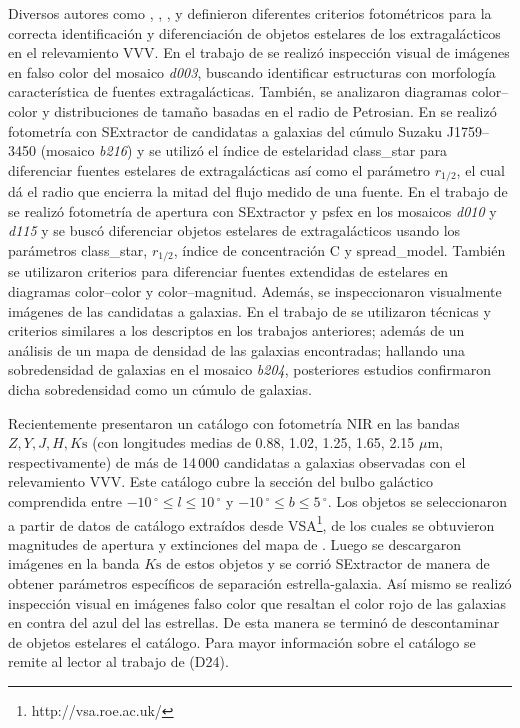 \documentclass[baaa]{baaa}
\begin{document}
Diversos autores como \cite{amores2012}, \cite{coldwell2014}, \cite{baravalle2018}, \cite{galdeano2021} y \cite{Duplancic2024} definieron diferentes criterios fotométricos para la correcta identificación y diferenciación de objetos estelares de los extragalácticos en el relevamiento VVV. En el trabajo de \cite{amores2012} se realizó inspección visual de imágenes en falso color del mosaico \textit{d003}, buscando identificar estructuras con morfología característica de fuentes extragalácticas. También, se analizaron diagramas color--color y distribuciones de tamaño basadas en el radio de Petrosian. En \cite{coldwell2014} se realizó fotometría con {\sc SExtractor} \citep{bertin} de candidatas a galaxias del cúmulo Suzaku J1759--3450 (mosaico \textit{b216}) y se utilizó el índice de estelaridad {\rm class\_star} para diferenciar fuentes estelares de extragalácticas así como el parámetro $r_{1/2}$, el cual dá el radio que encierra la mitad del flujo medido de una fuente. En el trabajo de \cite{baravalle2018} se realizó fotometría de apertura con {\sc SExtractor} y {\sc psfex} \citep{bertin2011} en los mosaicos \textit{d010} y \textit{d115} y se buscó diferenciar objetos estelares de extragalácticos usando los parámetros {\rm class\_star}, $r_{1/2}$, índice de concentración C y {\rm spread\_model}. También se utilizaron criterios para diferenciar fuentes extendidas de estelares en diagramas color--color y color--magnitud. Además, se inspeccionaron visualmente imágenes de las candidatas a galaxias. En el trabajo de \cite{galdeano2021} se utilizaron técnicas y criterios similares a los descriptos en los trabajos anteriores; además de un análisis de un mapa de densidad de las galaxias encontradas; hallando una sobredensidad de galaxias en el mosaico \textit{b204}, posteriores estudios \citep{galdeano2022} confirmaron dicha sobredensidad como un cúmulo de galaxias.

Recientemente \cite{Duplancic2024} presentaron un catálogo con  fotometría NIR en las bandas $Z, Y, J, H, K\mathrm{s}$ (con longitudes medias de 0.88, 1.02, 1.25, 1.65, 2.15 $\mu \mathrm{m}$, respectivamente) de más de 14\,000 candidatas a galaxias observadas con el relevamiento VVV. Este catálogo cubre la sección del bulbo galáctico comprendida entre $-10\,^\circ \leq l \leq 10\,^\circ$ y $-10\,^\circ\leq b \leq 5\,^\circ$.  Los objetos se seleccionaron a partir de datos de catálogo extraídos desde VSA\footnote{http://vsa.roe.ac.uk/}, de los cuales se obtuvieron magnitudes de apertura y extinciones del mapa de \cite{chen2013}. Luego se descargaron imágenes en la banda $K\mathrm{s}$ de estos objetos y se corrió {\sc SExtractor} de manera de obtener parámetros específicos de separación estrella-galaxia. Así mismo se realizó inspección visual en imágenes falso color que resaltan el color rojo de las galaxias en contra del azul del las estrellas. De esta manera se terminó de descontaminar de objetos estelares el catálogo. Para mayor información sobre el catálogo se remite al lector al trabajo de \citet{Duplancic2024} (D24).
\end{document}

